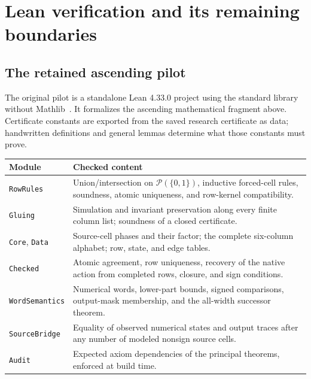 \section{Lean verification and its remaining boundaries}\label{sec:lean}

\subsection{The retained ascending pilot}
The original pilot is a standalone Lean 4.33.0 project using the standard library without Mathlib~\cite{Lean4,LeanReference}. It formalizes the ascending mathematical fragment above. Certificate constants are exported from the saved research certificate as data; handwritten definitions and general lemmas determine what those constants must prove.

\begin{center}\small
\begin{tabularx}{\textwidth}{@{}lX@{}}
\toprule
Module & Checked content\\
\midrule
\texttt{RowRules} & Union/intersection on $\mathcal P(\{0,1\})$, inductive forced-cell rules, soundness, atomic uniqueness, and row-kernel compatibility.\\
\texttt{Gluing} & Simulation and invariant preservation along every finite column list; soundness of a closed certificate.\\
\texttt{Core}, \texttt{Data} & Source-cell phases and their factor; the complete six-column alphabet; row, state, and edge tables.\\
\texttt{Checked} & Atomic agreement, row uniqueness, recovery of the native action from completed rows, closure, and sign conditions.\\
\texttt{WordSemantics} & Numerical words, lower-part bounds, signed comparisons, output-mask membership, and the all-width successor theorem.\\
\texttt{SourceBridge} & Equality of observed numerical states and output traces after any number of modeled nonsign source cells.\\
\texttt{Audit} & Expected axiom dependencies of the principal theorems, enforced at build time.\\
\bottomrule
\end{tabularx}
\end{center}

